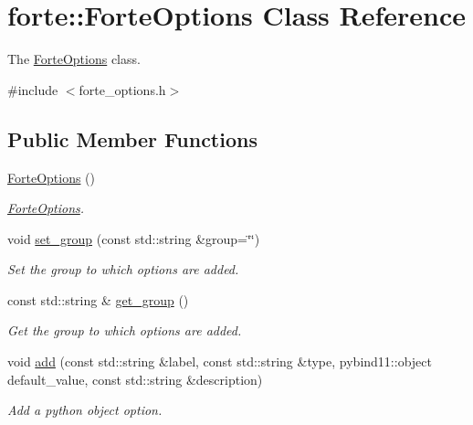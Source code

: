 \hypertarget{classforte_1_1_forte_options}{}\section{forte\+:\+:Forte\+Options Class Reference}
\label{classforte_1_1_forte_options}


The \mbox{\hyperlink{classforte_1_1_forte_options}{Forte\+Options}} class.  




{\ttfamily \#include $<$forte\+\_\+options.\+h$>$}

\subsection*{Public Member Functions}
\begin{DoxyCompactItemize}
\item 
\mbox{\hyperlink{classforte_1_1_forte_options_a0dc45f01fa34915601a959ee2da03fa3}{Forte\+Options}} ()
\begin{DoxyCompactList}\small\item\em \mbox{\hyperlink{classforte_1_1_forte_options}{Forte\+Options}}. \end{DoxyCompactList}\item 
void \mbox{\hyperlink{classforte_1_1_forte_options_a56aa020531457ca53a94da2fb5695618}{set\+\_\+group}} (const std\+::string \&group=\char`\"{}\char`\"{})
\begin{DoxyCompactList}\small\item\em Set the group to which options are added. \end{DoxyCompactList}\item 
const std\+::string \& \mbox{\hyperlink{classforte_1_1_forte_options_a4fd3d46c0072331c9d7f1bf5782201ea}{get\+\_\+group}} ()
\begin{DoxyCompactList}\small\item\em Get the group to which options are added. \end{DoxyCompactList}\item 
void \mbox{\hyperlink{classforte_1_1_forte_options_aa38bbfe45dbc347dacd46df005534f2a}{add}} (const std\+::string \&label, const std\+::string \&type, pybind11\+::object default\+\_\+value, const std\+::string \&description)
\begin{DoxyCompactList}\small\item\em Add a python object option. \end{DoxyCompactList}\item 

\end{DoxyCompactItemize}
